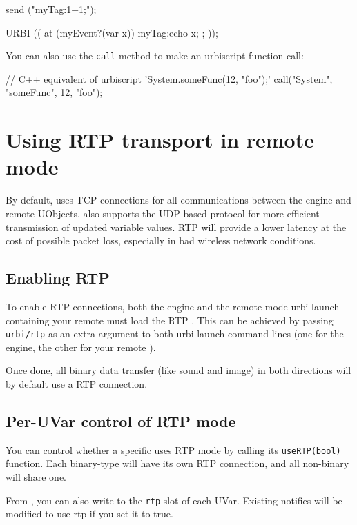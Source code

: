 \begin{urbiunchecked}
send ("myTag:1+1;");

URBI (( at (myEvent?(var x)) { myTag:echo x; }; ));
\end{urbiunchecked}

You can also use the \lstinline{call} method to make an urbiscript function
call:

\begin{urbiunchecked}
// C++ equivalent of urbiscript 'System.someFunc(12, "foo");'
call("System", "someFunc", 12, "foo");
\end{urbiunchecked}

\section{Using RTP transport in remote mode}
\label{sec:uob:api:rtp}

By default, \urbi uses TCP connections for all communications between the
engine and remote UObjects. \urbi also supports the UDP-based 
protocol for more efficient transmission of updated variable values. RTP
will provide a lower latency at the cost of possible packet loss, especially
in bad wireless network conditions.

\subsection{Enabling RTP}

To enable RTP connections, both the engine and the remote-mode urbi-launch
containing your remote \UObject must load the RTP \UObject. This can be
achieved by passing \lstinline|urbi/rtp| as an extra argument to both
urbi-launch command lines (one for the engine, the other for your remote
\UObject).

Once done, all binary data transfer (like sound and image) in both
directions will by default use a RTP connection.

\subsection{Per-UVar control of RTP mode}

You can control whether a specific \UVar uses RTP mode by calling its
\lstinline|useRTP(bool)| function. Each binary-type \UVar will have its own
RTP connection, and all non-binary \UVar will share one.

From \us, you can also write to the \lstinline|rtp| slot of each UVar. Existing
notifies will be modified to use rtp if you set it to true.


